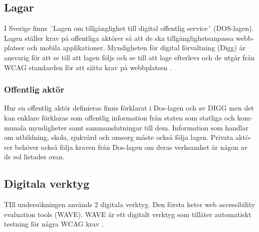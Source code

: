 \documentclass[11p]{article}
\begin{document}
\begin{otherlanguage}{swedish}
    \subsection{Lagar}
    I Sverige finns ¨Lagen om tillgänglighet till digital offentlig service¨ (DOS-lagen)\parencite{Dos-lagen}.
    Lagen ställer krav på offentliga aktörer så att de ska tillgänglighetsanpassa webbplatser och mobila applikationer.
    Myndigheten för digital förvaltning (Digg) är ansvarig för att se till att lagen följs och se till att lage efterlevs och de utgår från WCAG standarden för att sätta krav på webbplatsen \parencite{Utförande_av_Dos_lagen}. %

    \subsubsection{Offentlig aktör}
    Hur en offentlig aktör definieras finns förklarat i Dos-lagen \parencite{Dos-lagen} och av DIGG \parencite{Om_Dos-lagen} men det kan enklare förklaras som offentlig information från staten som statliga och kommunala myndigheter samt sammanslutningar till dem.
    Information som handlar om utbildning, skola, sjukvård och omsorg måste också följa lagen.
    Privata aktörer behöver också följa kraven från Dos-lagen om deras verksamhet är någon av de sol listades ovan.

    \subsection{Digitala verktyg}
    TIll undersökningen används 2 digitala verktyg.
    Den första heter web accessibility evaluation tools (WAVE).
    WAVE är ett digitalt verktyg som tillåter automatiskt testning för några WCAG krav \parencite{WAVE}.


\end{otherlanguage}
\end{document}
